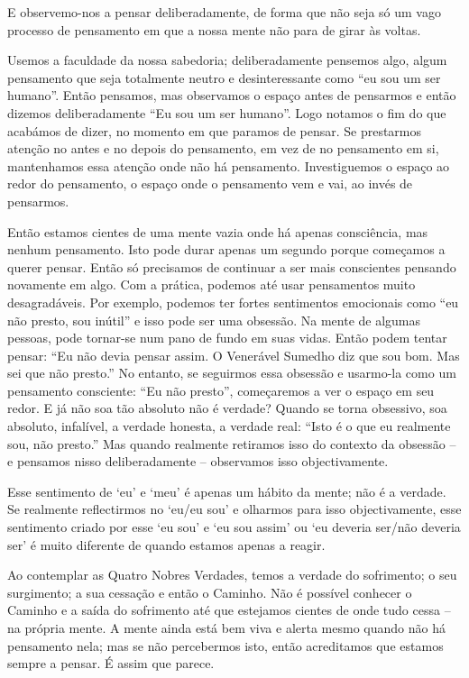 E observemo-nos a pensar deliberadamente, de forma que não seja só um vago
processo de pensamento em que a nossa mente não para de girar às voltas.

Usemos a faculdade da nossa sabedoria; deliberadamente pensemos algo, algum
pensamento que seja totalmente neutro e desinteressante como ``eu sou um ser
humano''. Então pensamos, mas observamos o espaço antes de pensarmos e então
dizemos deliberadamente ``Eu sou um ser humano''. Logo notamos o fim do que
acabámos de dizer, no momento em que paramos de pensar. Se prestarmos atenção no
antes e no depois do pensamento, em vez de no pensamento em si, mantenhamos essa
atenção onde não há pensamento. Investiguemos o espaço ao redor do pensamento, o
espaço onde o pensamento vem e vai, ao invés de pensarmos.

Então estamos cientes de uma mente vazia onde há apenas consciência, mas nenhum
pensamento. Isto pode durar apenas um segundo porque começamos a querer pensar.
Então só precisamos de continuar a ser mais conscientes pensando novamente em
algo. Com a prática, podemos até usar pensamentos muito desagradáveis. Por
exemplo, podemos ter fortes sentimentos emocionais como ``eu não presto, sou
inútil'' e isso pode ser uma obsessão. Na mente de algumas pessoas, pode
tornar-se num pano de fundo em suas vidas. Então podem tentar pensar: ``Eu não
devia pensar assim. O Venerável Sumedho diz que sou bom. Mas sei que não
presto.'' No entanto, se seguirmos essa obsessão e usarmo-la como um pensamento
consciente: ``Eu não presto'', começaremos a ver o espaço em seu redor. E já não
soa tão absoluto não é verdade? Quando se torna obsessivo, soa absoluto,
infalível, a verdade honesta, a verdade real: ``Isto é o que eu realmente sou,
não presto.'' Mas quando realmente retiramos isso do contexto da obsessão -- e
pensamos nisso deliberadamente -- observamos isso objectivamente.

Esse sentimento de `eu' e `meu' é apenas um hábito da mente; não é a verdade. Se
realmente reflectirmos no `eu/eu sou' e olharmos para isso objectivamente, esse
sentimento criado por esse `eu sou' e `eu sou assim' ou `eu deveria ser/não
deveria ser' é muito diferente de quando estamos apenas a reagir.

Ao contemplar as Quatro Nobres Verdades, temos a verdade do sofrimento; o seu
surgimento; a sua cessação e então o Caminho. Não é possível conhecer o Caminho
e a saída do sofrimento até que estejamos cientes de onde tudo cessa -- na
própria mente. A mente ainda está bem viva e alerta mesmo quando não há
pensamento nela; mas se não percebermos isto, então acreditamos que estamos
sempre a pensar. É assim que parece.


